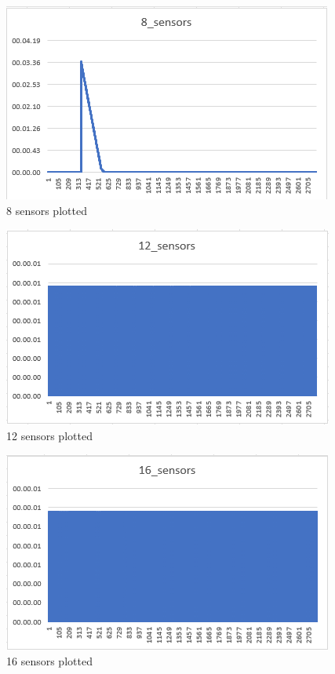 \begin{figure}[!ht]
    \centering
    \includegraphics[scale=0.8]{Images/8sensors.png}
    \caption{8 sensors plotted}
    \label{figure:6}
\end{figure}

\begin{figure}[!ht]
    \centering
    \includegraphics[scale=0.8]{Images/12sensors.png}
    \caption{12 sensors plotted}
    \label{figure:7}
\end{figure}

\begin{figure}[!ht]
    \centering
    \includegraphics[scale=0.8]{Images/16sensors.png}
    \caption{16 sensors plotted}
    \label{figure:8}
\end{figure}

